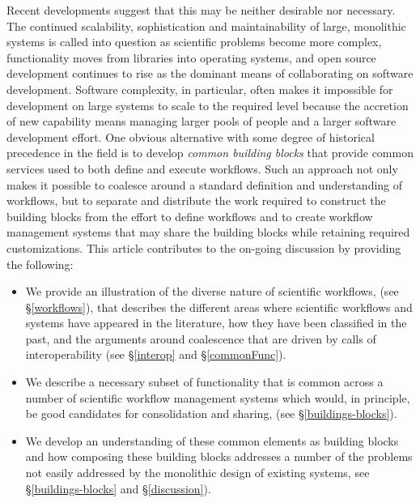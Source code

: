 Recent developments suggest that this may be neither desirable nor necessary.
The continued scalability, sophistication and maintainability of large, monolithic systems is called into question as scientific problems become more complex, functionality moves from libraries into operating systems, and open source development continues to rise as the dominant means of collaborating on software development. Software complexity, in particular, often makes it
impossible for development on large systems to scale to the required level 
because the accretion of new capability means managing larger pools of
people and a larger software development effort. One obvious alternative with
some degree of historical precedence in the field is to develop \textit{common
building blocks} that provide common services used to both define and execute
workflows. Such an approach not only makes it possible to coalesce around a
standard definition and understanding of workflows, but to separate and
distribute the work required to construct the building blocks from the effort to
define workflows and to create workflow management systems that may share the
building blocks while retaining required customizations. This article
contributes to the on-going discussion by providing the following:
\begin{itemize}
\item We provide an illustration of the diverse nature of
scientific workflows, (see \S \ref{workflows}), that describes the different
areas where scientific workflows and systems have appeared in the literature,
how they have been classified in the past, and the arguments around coalescence
that are driven by calls of interoperability (see \S\ref{interop} and \S\ref{commonFunc}). 
\item We describe a necessary
subset of functionality that is common across a number of scientific workflow
management systems which would, in principle, be good candidates for
consolidation and sharing, (see \S \ref{buildings-blocks}).
\item We develop an understanding of
these common elements as building blocks and how composing these building blocks
addresses a number of the problems not easily addressed by the monolithic design
of existing systems, see \S\ref{buildings-blocks} and \S\ref{discussion}).
\end{itemize}

